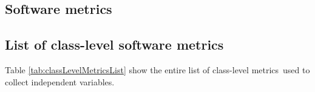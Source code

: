 \begin{apendicesenv}

    \partapendices*

    \chapter{Software metrics}
    \label{appe:A}
    
    \section{List of class-level software metrics}
    
    Table \ref{tab:classLevelMetricsList} show the entire list of class-level metrics\footnotemark ~used to collect independent variables.
    

\end{apendicesenv}
